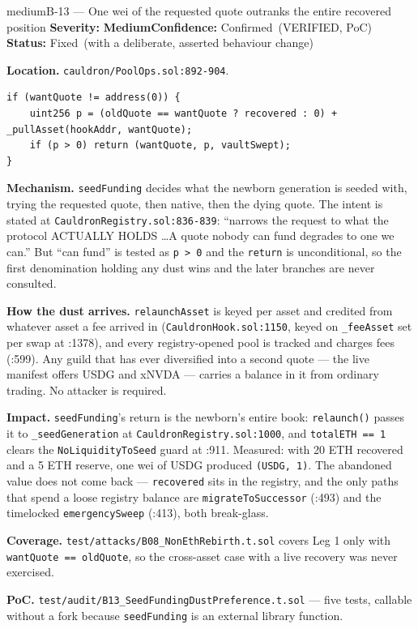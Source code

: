 \documentclass[11pt,a4paper]{article}
\newcommand{\SevMed}{\textcolor{medium}{\textbf{Medium}}}
\newcommand{\Conf}{\textcolor{critical}{Confirmed}}
\newcommand{\Fixed}{\textcolor{good}{Fixed}}
\newcommand{\code}[1]{\texttt{\small #1}}
\newcommand{\fileref}[1]{\texttt{\scriptsize #1}}
\begin{document}
\begin{findingbox}{medium}{B-13 --- One wei of the requested quote outranks the entire recovered position}
\textbf{Severity:} \SevMed \quad \textbf{Confidence:} \Conf\ (VERIFIED, PoC) \quad
\textbf{Status:} \Fixed\ (with a deliberate, asserted behaviour change)

\medskip
\textbf{Location.} \fileref{cauldron/PoolOps.sol:892-904}.

\begin{lstlisting}
if (wantQuote != address(0)) {
    uint256 p = (oldQuote == wantQuote ? recovered : 0) + _pullAsset(hookAddr, wantQuote);
    if (p > 0) return (wantQuote, p, vaultSwept);
}
\end{lstlisting}

\textbf{Mechanism.} \code{seedFunding} decides what the newborn generation is seeded with,
trying the requested quote, then native, then the dying quote. The intent is stated at
\fileref{CauldronRegistry.sol:836-839}: ``narrows the request to what the protocol ACTUALLY
HOLDS \ldots A quote nobody can fund degrades to one we can.'' But ``can fund'' is tested
as \code{p > 0} and the \code{return} is unconditional, so the first denomination holding
any dust wins and the later branches are never consulted.

\textbf{How the dust arrives.} \code{relaunchAsset} is keyed per asset and credited from
whatever asset a fee arrived in (\fileref{CauldronHook.sol:1150}, keyed on
\code{\_feeAsset} set per swap at :1378), and every registry-opened pool is tracked and
charges fees (:599). Any guild that has ever diversified into a second quote --- the live
manifest offers USDG and xNVDA --- carries a balance in it from ordinary trading. No
attacker is required.

\textbf{Impact.} \code{seedFunding}'s return is the newborn's entire book:
\code{relaunch()} passes it to \code{\_seedGeneration} at
\fileref{CauldronRegistry.sol:1000}, and \code{totalETH == 1} clears the
\code{NoLiquidityToSeed} guard at :911. Measured: with 20 ETH recovered and a 5 ETH
reserve, one wei of USDG produced \code{(USDG, 1)}. The abandoned value does not come
back --- \code{recovered} sits in the registry, and the only paths that spend a loose
registry balance are \code{migrateToSuccessor} (:493) and the timelocked
\code{emergencySweep} (:413), both break-glass.

\textbf{Coverage.} \fileref{test/attacks/B08\_NonEthRebirth.t.sol} covers Leg 1 only with
\code{wantQuote == oldQuote}, so the cross-asset case with a live recovery was never
exercised.

\textbf{PoC.} \fileref{test/audit/B13\_SeedFundingDustPreference.t.sol} --- five tests,
callable without a fork because \code{seedFunding} is an external library function.
\end{findingbox}
\end{document}
